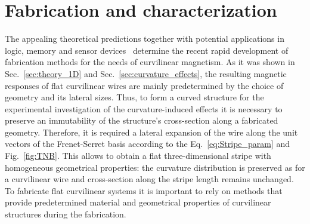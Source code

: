 \section{Fabrication and characterization}\label{sec:fabrication}

The appealing theoretical predictions together with potential applications in logic, memory and sensor devices~\cite{Allwood02,Allwood05,Parkin08,Parkin15} determine the recent rapid development of fabrication methods for the needs of curvilinear magnetism. As it was shown in Sec.~\ref{sec:theory_1D} and Sec.~\ref{sec:curvature_effects}, the resulting magnetic responses of flat curvilinear wires are mainly predetermined by the choice of geometry and its lateral sizes. Thus, to form a curved structure for the experimental investigation of the curvature-induced effects it is necessary to preserve an immutability of the structure's cross-section along a fabricated geometry. Therefore, it is required a lateral expansion of the wire along the unit vectors of the Frenet-Serret basis according to the Eq.~\eqref{eq:Stripe_param} and Fig.~\ref{fig:TNB}. This allows to obtain a flat three-dimensional stripe with homogeneous geometrical properties: the curvature distribution is preserved as for a curvilinear wire and cross-section along the stripe length remains unchanged. To fabricate flat curvilinear systems it is important to rely on methods that provide predetermined material and geometrical properties of curvilinear structures during the fabrication. 

